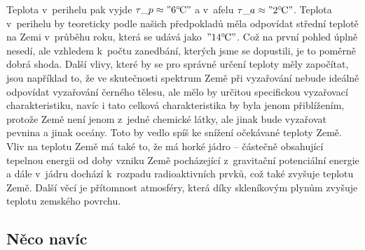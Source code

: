 \documentclass[twoside,fykos]{fksserie}
\begin{document}
% 

Teplota v~perihelu pak vyjde $\tau\_p \approx "6 ^\circ\mskip-2mu\mathrm{C}"$ a v~afelu $\tau\_a \approx
"2 ^\circ\mskip-2mu\mathrm{C}"$. Teplota v~perihelu by teoreticky podle našich předpokladů
měla odpovídat střední teplotě na Zemi v~průběhu roku, která se udává
jako~$"14 ^\circ\mskip-2mu\mathrm{C}"$. Což na první pohled úplně nesedí, ale vzhledem k~počtu
zanedbání, kterých jsme se dopustili, je to poměrně dobrá shoda. Další 
vlivy, které by se pro správné určení teploty měly započítat, jsou 
například to, že ve skutečnosti spektrum Země při vyzařování nebude 
ideálně odpovídat vyzařování černého tělesu, ale mělo by určitou 
specifickou vyzařovací charakteristiku, navíc i tato celková 
charakteristika by byla jenom přiblížením, protože Země není jenom 
z~jedné chemické látky, ale jinak bude vyzařovat pevnina a jinak 
oceány. Toto by vedlo spíš ke snížení očekávané teploty Země. Vliv na
teplotu Země má také to, že má horké jádro -- částečně obsahující 
tepelnou energii od doby vzniku Země pocházející z~gravitační
potenciální energie a dále v~jádru dochází k~rozpadu radioaktivních 
prvků, což také zvyšuje teplotu Země.
Další věcí je přítomnost atmosféry, která díky skleníkovým
plynům zvyšuje teplotu zemského povrchu.


\subsection{Něco navíc}
\end{document}
